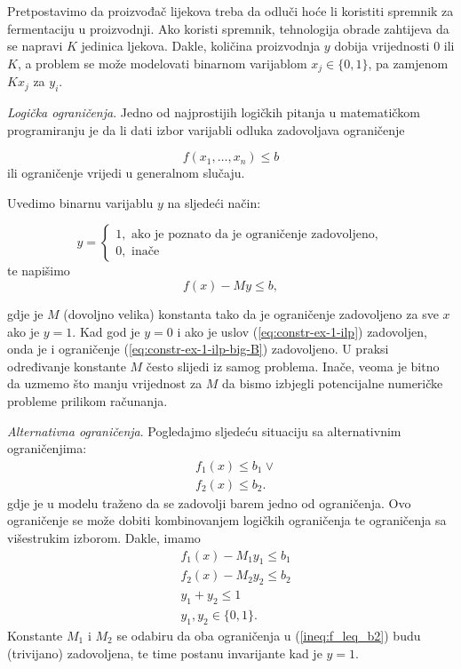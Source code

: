 \documentclass[a4paper, utf8, 11pt, colorlinks]{book}
\begin{document}
Pretpostavimo da proizvođač lijekova treba da odluči hoće li koristiti spremnik za fermentaciju u proizvodnji. Ako koristi spremnik, tehnologija obrade zahtijeva da se napravi $K$ jedinica ljekova. Dakle, količina proizvodnja $y$ dobija vrijednosti 0 ili $K$, a problem se može modelovati binarnom varijablom $x_j \in \{ 0, 1\}$, pa zamjenom $Kx_j$ za $y_i$. 

\emph{Logička ograničenja}. Jedno od najprostijih logičkih pitanja u matematičkom programiranju je da li dati izbor varijabli odluka zadovoljava ograničenje

\begin{equation}\label{eq:constr-ex-1-ilp}
   f(x_1,\ldots, x_n )\leq b
\end{equation}
 ili   ograničenje vrijedi u generalnom slučaju.
 
 Uvedimo binarnu varijablu $y$ na sljedeći način:
 
$$y =\begin{cases}
1, \mbox{ ako je poznato da je ograničenje zadovoljeno}, \\
0, \mbox{ inače}
\end{cases}$$
te napišimo 
\begin{equation}\label{eq:constr-ex-1-ilp-big-B}
   f(x) - M y \leq b,
\end{equation}

gdje je $M$ (dovoljno velika) konstanta tako da je 
ograničenje zadovoljeno za sve $x$ ako je $y =1$. Kad god je $y=0$ i ako je uslov (\ref{eq:constr-ex-1-ilp}) zadovoljen, onda je i ograničenje (\ref{eq:constr-ex-1-ilp-big-B}) zadovoljeno. U praksi   određivanje konstante $M$ često slijedi iz samog problema. Inače, veoma je bitno da uzmemo što manju vrijednost za $M$ da bismo izbjegli potencijalne numeričke probleme prilikom računanja. 

\emph{Alternativna ograničenja}. Pogledajmo sljedeću situaciju sa alternativnim ograničenjima:
\begin{align}
     &f_1(x) \leq b_1 \vee \nonumber\\
     &f_2(x) \leq b_2.\label{ineq:f_leq_b2}
\end{align}
gdje je u modelu traženo da se zadovolji barem jedno od ograničenja. 
Ovo ograničenje se može dobiti kombinovanjem logičkih ograničenja te ograničenja sa višestrukim izborom. Dakle, imamo 
\begin{align*}
      &f_1(x) - M_1 y_1  \leq b_1 \\
      &f_2(x) - M_2 y_2  \leq b_2 \\
      & y_1 + y_2 \leq 1 \\
      & y_1, y_2 \in \{0, 1\}.
\end{align*}
Konstante $M_1$ i $M_2$ se odabiru da oba ograničenja u (\ref{ineq:f_leq_b2})  budu (trivijano) zadovoljena, te time postanu invarijante kad je $y=1$.
\end{document}
